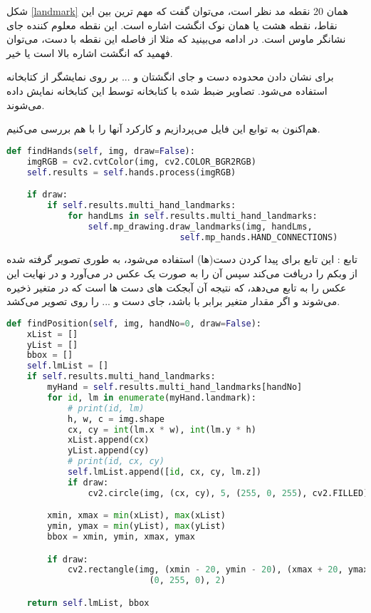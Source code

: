 \documentclass{article}
\begin{document}
شکل \ref{landmark} همان 20 نقطه مد نظر است، می‌توان گفت که مهم ترین بین این نقاط، نقطه هشت یا همان نوک انگشت اشاره است. این نقطه معلوم کننده جای نشانگر ماوس است. در ادامه می‌بینید که مثلا از فاصله این نقطه با دست، می‌توان فهمید که انگشت اشاره بالا است یا خیر.
\cite{medipipe}

برای نشان دادن محدوده دست و جای انگشتان و ... بر روی نمایشگر از کتابخانه  استفاده می‌شود. تصاویر ضبط شده با کتابخانه  توسط این کتابخانه نمایش داده می‌شوند. 
\cite{cv2}

هم‌اکنون به توابع این فایل می‌پردازیم و کارکرد آنها را با هم بررسی می‌کنیم.

\begin{latin}
\begin{lstlisting}[language=python]
def findHands(self, img, draw=False):
    imgRGB = cv2.cvtColor(img, cv2.COLOR_BGR2RGB)
    self.results = self.hands.process(imgRGB)

    if draw:
        if self.results.multi_hand_landmarks:
            for handLms in self.results.multi_hand_landmarks:
                self.mp_drawing.draw_landmarks(img, handLms,
                                  self.mp_hands.HAND_CONNECTIONS)
\end{lstlisting}
\end{latin}

تابع :
این تابع برای پیدا کردن دست(ها) استفاده می‌شود، به طوری تصویر گرفته شده از وبکم را دریافت می‌کند سپس آن را به صورت یک عکس  در می‌آورد و در نهایت این عکس را به تابع  می‌دهد، که نتیجه آن آبجکت های دست ها است که در متغیر  ذخیره می‌شوند و اگر مقدار متغیر  برابر با  باشد، جای دست و ... را روی تصویر می‌کشد.

\begin{latin}
\begin{lstlisting}[language=python]
def findPosition(self, img, handNo=0, draw=False):
    xList = []
    yList = []
    bbox = []
    self.lmList = []
    if self.results.multi_hand_landmarks:
        myHand = self.results.multi_hand_landmarks[handNo]
        for id, lm in enumerate(myHand.landmark):
            # print(id, lm)
            h, w, c = img.shape
            cx, cy = int(lm.x * w), int(lm.y * h)
            xList.append(cx)
            yList.append(cy)
            # print(id, cx, cy)
            self.lmList.append([id, cx, cy, lm.z])
            if draw:
                cv2.circle(img, (cx, cy), 5, (255, 0, 255), cv2.FILLED)

        xmin, xmax = min(xList), max(xList)
        ymin, ymax = min(yList), max(yList)
        bbox = xmin, ymin, xmax, ymax

        if draw:
            cv2.rectangle(img, (xmin - 20, ymin - 20), (xmax + 20, ymax + 20),
                            (0, 255, 0), 2)

    return self.lmList, bbox
\end{lstlisting}
\end{latin}
\end{document}

